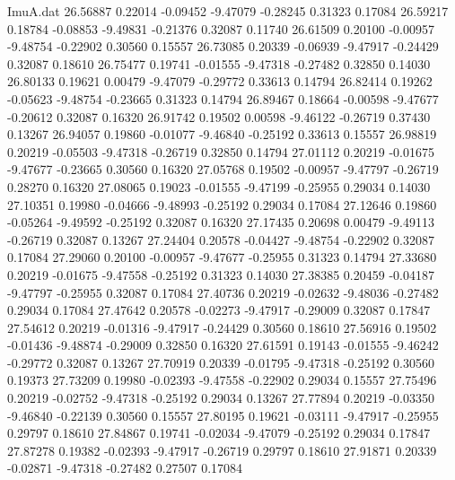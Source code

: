 \begin{filecontents}{ImuA.dat}
  26.56887    0.22014   -0.09452   -9.47079   -0.28245    0.31323    0.17084
  26.59217    0.18784   -0.08853   -9.49831   -0.21376    0.32087    0.11740
  26.61509    0.20100   -0.00957   -9.48754   -0.22902    0.30560    0.15557
  26.73085    0.20339   -0.06939   -9.47917   -0.24429    0.32087    0.18610
  26.75477    0.19741   -0.01555   -9.47318   -0.27482    0.32850    0.14030
  26.80133    0.19621    0.00479   -9.47079   -0.29772    0.33613    0.14794
  26.82414    0.19262   -0.05623   -9.48754   -0.23665    0.31323    0.14794
  26.89467    0.18664   -0.00598   -9.47677   -0.20612    0.32087    0.16320
  26.91742    0.19502    0.00598   -9.46122   -0.26719    0.37430    0.13267
  26.94057    0.19860   -0.01077   -9.46840   -0.25192    0.33613    0.15557
  26.98819    0.20219   -0.05503   -9.47318   -0.26719    0.32850    0.14794
  27.01112    0.20219   -0.01675   -9.47677   -0.23665    0.30560    0.16320
  27.05768    0.19502   -0.00957   -9.47797   -0.26719    0.28270    0.16320
  27.08065    0.19023   -0.01555   -9.47199   -0.25955    0.29034    0.14030
  27.10351    0.19980   -0.04666   -9.48993   -0.25192    0.29034    0.17084
  27.12646    0.19860   -0.05264   -9.49592   -0.25192    0.32087    0.16320
  27.17435    0.20698    0.00479   -9.49113   -0.26719    0.32087    0.13267
  27.24404    0.20578   -0.04427   -9.48754   -0.22902    0.32087    0.17084
  27.29060    0.20100   -0.00957   -9.47677   -0.25955    0.31323    0.14794
  27.33680    0.20219   -0.01675   -9.47558   -0.25192    0.31323    0.14030
  27.38385    0.20459   -0.04187   -9.47797   -0.25955    0.32087    0.17084
  27.40736    0.20219   -0.02632   -9.48036   -0.27482    0.29034    0.17084
  27.47642    0.20578   -0.02273   -9.47917   -0.29009    0.32087    0.17847
  27.54612    0.20219   -0.01316   -9.47917   -0.24429    0.30560    0.18610
  27.56916    0.19502   -0.01436   -9.48874   -0.29009    0.32850    0.16320
  27.61591    0.19143   -0.01555   -9.46242   -0.29772    0.32087    0.13267
  27.70919    0.20339   -0.01795   -9.47318   -0.25192    0.30560    0.19373
  27.73209    0.19980   -0.02393   -9.47558   -0.22902    0.29034    0.15557
  27.75496    0.20219   -0.02752   -9.47318   -0.25192    0.29034    0.13267
  27.77894    0.20219   -0.03350   -9.46840   -0.22139    0.30560    0.15557
  27.80195    0.19621   -0.03111   -9.47917   -0.25955    0.29797    0.18610
  27.84867    0.19741   -0.02034   -9.47079   -0.25192    0.29034    0.17847
  27.87278    0.19382   -0.02393   -9.47917   -0.26719    0.29797    0.18610
  27.91871    0.20339   -0.02871   -9.47318   -0.27482    0.27507    0.17084

\end{filecontents}
